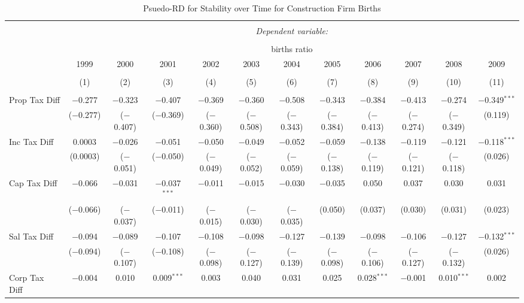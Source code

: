 
\begin{table}[!htbp] \centering 
  \caption{Psuedo-RD for Stability over Time for  Construction Firm Births} 
  \label{23year} 
\small 
\begin{tabular}{@{\extracolsep{5pt}}lccccccccccc} 
\\[-1.8ex]\hline 
\hline \\[-1.8ex] 
 & \multicolumn{11}{c}{\textit{Dependent variable:}} \\ 
\cline{2-12} 
\\[-1.8ex] & \multicolumn{11}{c}{births ratio} \\ 
 & 1999 & 2000 & 2001 & 2002 & 2003 & 2004 & 2005 & 2006 & 2007 & 2008 & 2009 \\ 
\\[-1.8ex] & (1) & (2) & (3) & (4) & (5) & (6) & (7) & (8) & (9) & (10) & (11)\\ 
\hline \\[-1.8ex] 
 Prop Tax Diff & $-$0.277 & $-$0.323 & $-$0.407 & $-$0.369 & $-$0.360 & $-$0.508 & $-$0.343 & $-$0.384 & $-$0.413 & $-$0.274 & $-$0.349$^{***}$ \\ 
  & ($-$0.277) & ($-$0.407) & ($-$0.369) & ($-$0.360) & ($-$0.508) & ($-$0.343) & ($-$0.384) & ($-$0.413) & ($-$0.274) & ($-$0.349) & (0.119) \\ 
  Inc Tax Diff & 0.0003 & $-$0.026 & $-$0.051 & $-$0.050 & $-$0.049 & $-$0.052 & $-$0.059 & $-$0.138 & $-$0.119 & $-$0.121 & $-$0.118$^{***}$ \\ 
  & (0.0003) & ($-$0.051) & ($-$0.050) & ($-$0.049) & ($-$0.052) & ($-$0.059) & ($-$0.138) & ($-$0.119) & ($-$0.121) & ($-$0.118) & (0.026) \\ 
  Cap Tax Diff & $-$0.066 & $-$0.031 & $-$0.037$^{***}$ & $-$0.011 & $-$0.015 & $-$0.030 & $-$0.035 & 0.050 & 0.037 & 0.030 & 0.031 \\ 
  & ($-$0.066) & ($-$0.037) & ($-$0.011) & ($-$0.015) & ($-$0.030) & ($-$0.035) & (0.050) & (0.037) & (0.030) & (0.031) & (0.023) \\ 
  Sal Tax Diff & $-$0.094 & $-$0.089 & $-$0.107 & $-$0.108 & $-$0.098 & $-$0.127 & $-$0.139 & $-$0.098 & $-$0.106 & $-$0.127 & $-$0.132$^{***}$ \\ 
  & ($-$0.094) & ($-$0.107) & ($-$0.108) & ($-$0.098) & ($-$0.127) & ($-$0.139) & ($-$0.098) & ($-$0.106) & ($-$0.127) & ($-$0.132) & (0.026) \\ 
  Corp Tax Diff & $-$0.004 & 0.010 & 0.009$^{***}$ & 0.003 & 0.040 & 0.031 & 0.025 & 0.028$^{***}$ & $-$0.001 & 0.010$^{***}$ & 0.002 \\ 

\end{tabular}
\end{table}

